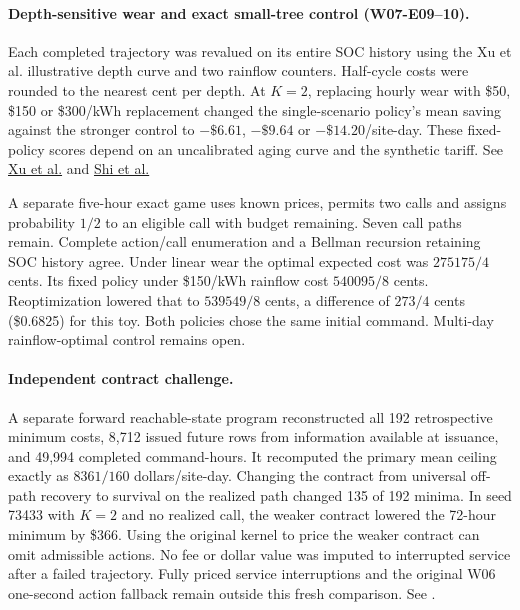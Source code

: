 \documentclass[11pt,letterpaper]{article}
\begin{document}
\paragraph{Depth-sensitive wear and exact small-tree control (W07-E09--10).}
Each completed trajectory was revalued on its entire SOC history using the Xu et al. illustrative depth curve and two rainflow counters. Half-cycle costs were rounded to the nearest cent per depth. At $K=2$, replacing hourly wear with \$50, \$150 or \$300/kWh replacement changed the single-scenario policy's mean saving against the stronger control to $-\$6.61$, $-\$9.64$ or $-\$14.20$/site-day. These fixed-policy scores depend on an uncalibrated aging curve and the synthetic tariff. See \href{https://arxiv.org/abs/1707.04567}{Xu et al.} and \href{https://arxiv.org/abs/1703.07968}{Shi et al.}

A separate five-hour exact game uses known prices, permits two calls and assigns probability $1/2$ to an eligible call with budget remaining. Seven call paths remain. Complete action/call enumeration and a Bellman recursion retaining SOC history agree. Under linear wear the optimal expected cost was $275175/4$ cents. Its fixed policy under \$150/kWh rainflow cost $540095/8$ cents. Reoptimization lowered that to $539549/8$ cents, a difference of $273/4$ cents (\$0.6825) for this toy. Both policies chose the same initial command. Multi-day rainflow-optimal control remains open.

\paragraph{Independent contract challenge.}
A separate forward reachable-state program reconstructed all 192 retrospective minimum costs, 8,712 issued future rows from information available at issuance, and 49,994 completed command-hours. It recomputed the primary mean ceiling exactly as $8361/160$ dollars/site-day. Changing the contract from universal off-path recovery to survival on the realized path changed 135 of 192 minima. In seed 73433 with $K=2$ and no realized call, the weaker contract lowered the 72-hour minimum by \$366. Using the original kernel to price the weaker contract can omit admissible actions. No fee or dollar value was imputed to interrupted service after a failed trajectory. Fully priced service interruptions and the original W06 one-second action fallback remain outside this fresh comparison. See .
\end{document}
